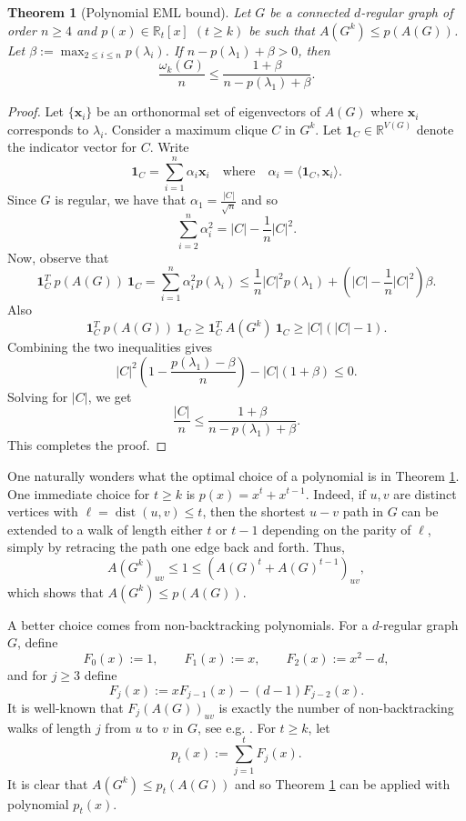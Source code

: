 \documentclass[10pt,a4paper]{article}
\theoremstyle{plain}
\newtheorem{theorem}{Theorem}[section]
\numberwithin{equation}{section}
\DeclareMathOperator{\dist}{dist}
\begin{document}
\begin{theorem}[Polynomial EML bound]\label{thm:EML_approach}
Let $G$ be a connected $d$-regular graph of order $n\ge 4$ and $p(x)\in \mathbb{R}_t[x]$ $(t\ge k)$ be such that $A(G^k)\le p(A(G))$. Let $\beta:=\max_{2\le i\le n} p(\lambda_i)$. If $n - p(\lambda_1) +  \beta > 0$, then
\[
\frac{\omega_k(G)}{n} \le \frac{1 + \beta}{n - p(\lambda_1) + \beta}.
\]
\end{theorem}

\begin{proof}
Let $\{\mathbf{x}_i \}$ be an orthonormal set of eigenvectors of $A(G)$ where $\mathbf{x}_i$ corresponds to $\lambda_i$. Consider a maximum clique $C$ in $G^k$. Let $\mathbf{1}_C \in \mathbb{R}^{V(G)}$ denote the indicator vector for $C$. Write 
    \[
    \mathbf{1}_C = \sum_{i=1}^n \alpha_i \mathbf{x}_i \quad \text{where}\quad  \alpha_i = \langle \mathbf{1}_C, \mathbf{x}_i \rangle.
    \]
Since $G$ is regular, we have that $\alpha_1 = \frac{|C|}{\sqrt{n}}$ and so
    \[
    \sum_{i=2}^n\alpha_i^2 = |C| - \frac{1}{n}|C|^2.
    \]    
Now, observe that 
    \[
    \mathbf{1}_C^T\ p(A(G))\ \mathbf{1}_C = \sum_{i=1}^n \alpha_i^2 p(\lambda_i) \le \frac{1}{n}|C|^2p(\lambda_1) + \left(|C| - \frac{1}{n}|C|^2 \right)\beta.
    \]
Also
    \[
    \mathbf{1}_C^T \ p(A(G))\ \mathbf{1}_C \geq \mathbf{1}_C^T\ A(G^k)\ \mathbf{1}_C \ge |C|(|C|-1).
    \] 
Combining the two inequalities gives
\[ |C|^2\left(1 - \frac{p(\lambda_1) -  \beta}{n}\right) - |C|\left(1 + \beta \right)\le 0.\]
Solving for $|C|$, we get 
 \[ \frac{|C|}{n} \le \frac{1 + \beta}{n - p(\lambda_1) +  \beta}.\]
 This completes the proof.
\end{proof}

One naturally wonders what the optimal choice of a polynomial is in Theorem \ref{thm:EML_approach}. One immediate choice for $t\ge k$ is $p(x) = x^t + x^{t-1}$. Indeed, if $u,v$ are distinct vertices with $\ell=\dist(u,v)\le t$, then the shortest $u-v$ path in $G$ can be extended to a walk of length either $t$ or $t-1$ depending on the parity of $\ell$, simply by retracing the path one edge back and forth. Thus, \[A(G^k)_{uv}\le 1 \le  \left(A(G)^t + A(G)^{t-1}\right)_{uv},\]
which shows that $A(G^k)\le p(A(G))$. 

A better choice comes from non-backtracking polynomials. For a $d$-regular graph $G$, define 
\[ F_0(x) := 1, \qquad F_1(x):=x, \qquad F_2(x) := x^2-d, \]
and for $j\ge 3$ define 
\[ F_j(x) := xF_{j-1}(x)-(d-1)F_{j-2}(x).\]
It is well-known that $F_j(A(G))_{uv}$ is exactly the number of non-backtracking walks of length $j$ from $u$ to $v$ in $G$, see  e.g. \cite{Alon_Benjamini_Lubetzky_Sodin_2007}. For $t\ge k$, let
\begin{equation}\label{eq:non_backtracking}
   p_t(x):=\sum_{j=1}^t F_j(x). 
\end{equation}
It is clear that $A(G^k)\le p_t(A(G))$ and so Theorem \ref{thm:EML_approach} can be applied with polynomial $p_t(x)$. 
\end{document}
